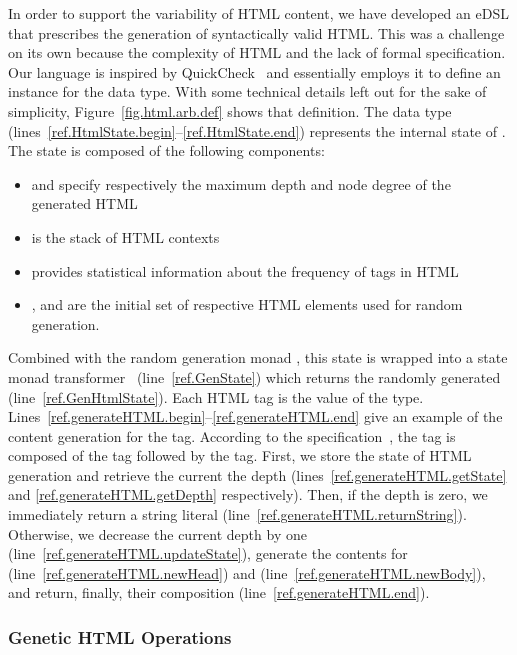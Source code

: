 In order to support the variability of HTML content, we have developed an eDSL that prescribes the generation of syntactically valid HTML. This was a challenge on its own because the complexity of HTML and the lack of formal specification. Our language is inspired by QuickCheck~\cite{claessen2011quickcheck} and essentially employs it to define an  instance for the  data type. With some technical details left out for the sake of simplicity, Figure~\ref{fig.html.arb.def} shows that definition. The data type  (lines~\ref{ref.HtmlState.begin}--\ref{ref.HtmlState.end}) represents the internal state of . The state is composed of the following components:
\begin{itemize}
\item {} and  specify respectively the maximum depth and node degree of the generated HTML
\item {} is the stack of HTML contexts
\item {} provides statistical information about the frequency of tags in HTML
\item {},  and  are the initial set of respective HTML elements used for random generation.
\end{itemize}
Combined with the random generation monad , this state is wrapped into a state monad transformer~\cite{jones1995functional} (line~\ref{ref.GenState}) which returns the randomly generated  (line~\ref{ref.GenHtmlState}). Each HTML tag is the value of the  type. Lines~\ref{ref.generateHTML.begin}--\ref{ref.generateHTML.end} give an example of the content generation for the  tag. According to the specification~\cite{htmlspec}, the tag is composed of the  tag followed by the  tag. First, we store the state of HTML generation and retrieve the current the depth (lines~\ref{ref.generateHTML.getState} and \ref{ref.generateHTML.getDepth} respectively). Then, if the depth is zero, we immediately return a string literal (line~\ref{ref.generateHTML.returnString}). Otherwise, we decrease the current depth by one (line~\ref{ref.generateHTML.updateState}), generate the contents for  (line~\ref{ref.generateHTML.newHead}) and  (line~\ref{ref.generateHTML.newBody}), and return, finally, their composition (line~\ref{ref.generateHTML.end}).

\subsubsection{Genetic HTML Operations}
\label{sub.sub.sec.genetic.oper}

